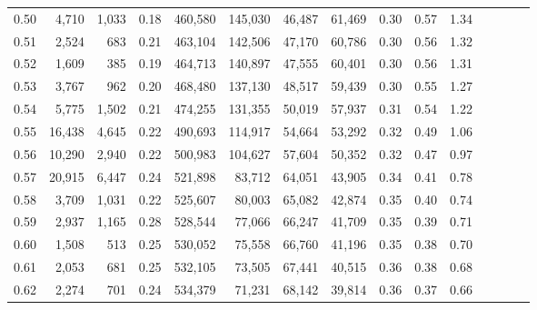 \begin{tabular}{rrrcrrrrrrrrrrr}
0.50 &   4,710 &  1,033 &                                       0.18 &  460,580 &  145,030 &   46,487 &   61,469 &  0.30 &  0.57 &                         1.34 \\
0.51 &   2,524 &    683 &                                       0.21 &  463,104 &  142,506 &   47,170 &   60,786 &  0.30 &  0.56 &                         1.32 \\
0.52 &   1,609 &    385 &                                       0.19 &  464,713 &  140,897 &   47,555 &   60,401 &  0.30 &  0.56 &                         1.31 \\
0.53 &   3,767 &    962 &                                       0.20 &  468,480 &  137,130 &   48,517 &   59,439 &  0.30 &  0.55 &                         1.27 \\
0.54 &   5,775 &  1,502 &                                       0.21 &  474,255 &  131,355 &   50,019 &   57,937 &  0.31 &  0.54 &                         1.22 \\
0.55 &  16,438 &  4,645 &                                       0.22 &  490,693 &  114,917 &   54,664 &   53,292 &  0.32 &  0.49 &                         1.06 \\
0.56 &  10,290 &  2,940 &                                       0.22 &  500,983 &  104,627 &   57,604 &   50,352 &  0.32 &  0.47 &                         0.97 \\
0.57 &  20,915 &  6,447 &                                       0.24 &  521,898 &   83,712 &   64,051 &   43,905 &  0.34 &  0.41 &                         0.78 \\
0.58 &   3,709 &  1,031 &                                       0.22 &  525,607 &   80,003 &   65,082 &   42,874 &  0.35 &  0.40 &                         0.74 \\
0.59 &   2,937 &  1,165 &                                       0.28 &  528,544 &   77,066 &   66,247 &   41,709 &  0.35 &  0.39 &                         0.71 \\
0.60 &   1,508 &    513 &                                       0.25 &  530,052 &   75,558 &   66,760 &   41,196 &  0.35 &  0.38 &                         0.70 \\
0.61 &   2,053 &    681 &                                       0.25 &  532,105 &   73,505 &   67,441 &   40,515 &  0.36 &  0.38 &                         0.68 \\
0.62 &   2,274 &    701 &                                       0.24 &  534,379 &   71,231 &   68,142 &   39,814 &  0.36 &  0.37 &                         0.66 \\

\end{tabular}
